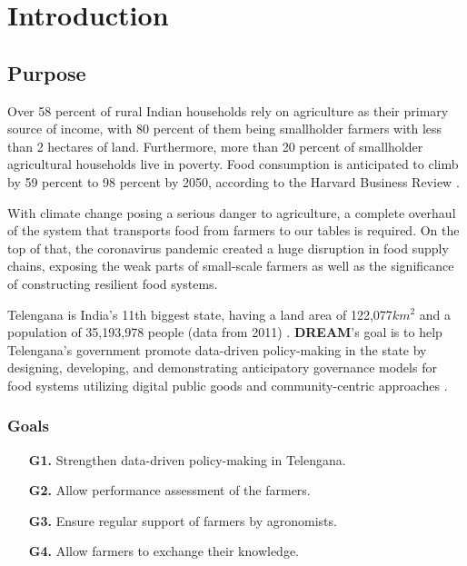 \chapter{Introduction}

\section{Purpose}



Over 58 percent of rural Indian households rely on agriculture as their primary source of income, with 80 percent of them being smallholder farmers with less than 2 hectares of land. Furthermore, more than 20 percent of smallholder agricultural households live in poverty. Food consumption is anticipated to climb by 59 percent to 98 percent by 2050, according to the Harvard Business Review \cite{global_demand_for_food}.

With climate change posing a serious danger to agriculture, a complete overhaul of the system that transports food from farmers to our tables is required. On the top of that, the coronavirus pandemic created a huge disruption in food supply chains, exposing the weak parts of small-scale farmers as well as the significance of constructing resilient food systems.

Telengana is India's 11th biggest state, having a land area of 122,077$km^2$ and a population of 35,193,978 people (data from 2011) \cite{telengana}. \textbf{DREAM}'s goal is to help Telengana’s government promote data-driven policy-making in the state by designing, developing, and demonstrating anticipatory governance models for food systems utilizing digital public goods and community-centric approaches \cite{reference_doc}.

\subsection{Goals} \label{subsec:goals}
\begin{itemize}
    \item [\textbf{G1.}] Strengthen data-driven policy-making in Telengana.
    \item [\textbf{G2.}] Allow performance assessment of the farmers.
    \item [\textbf{G3.}] Ensure regular support of farmers by agronomists.
    \item [\textbf{G4.}] Allow farmers to exchange their knowledge.
\end{itemize}

